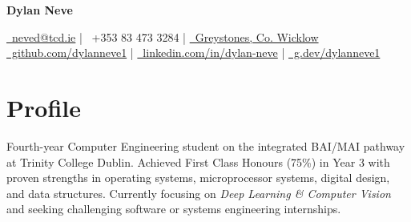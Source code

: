 \documentclass[10pt,a4paper]{article}
\begin{document}
\begin{center}
    {\Huge \bfseries Dylan Neve}
    \vspace{4pt}

    \href{mailto:neved@tcd.ie}{\faEnvelope\ neved@tcd.ie} \quad | \quad
    \faPhone\ +353 83 473 3284 \quad | \quad
    \href{https://www.google.com/maps/place/Greystones,+Co.+Wicklow}{\faMapMarker\ Greystones, Co. Wicklow} \\
    \href{https://github.com/dylanneve1}{\faGithub\ github.com/dylanneve1} \quad | \quad
    \href{https://linkedin.com/in/dylan-neve}{\faLinkedin\ linkedin.com/in/dylan-neve} \quad | \quad
    \href{https://g.dev/dylanneve1}{\faGoogle\ g.dev/dylanneve1}
\end{center}


\section*{Profile}
Fourth-year Computer Engineering student on the integrated BAI/MAI pathway at Trinity College Dublin. Achieved First Class Honours (75\%) in Year 3 with proven strengths in operating systems, microprocessor systems, digital design, and data structures. Currently focusing on \textit{Deep Learning \& Computer Vision} and seeking challenging software or systems engineering internships.


\end{document}
